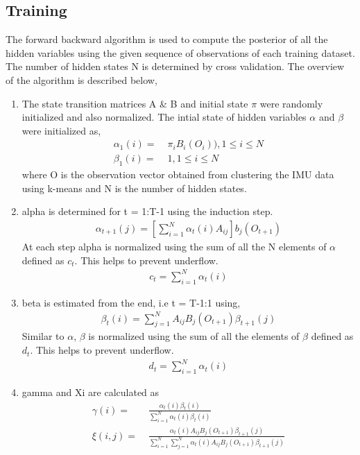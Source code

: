 \documentclass[fleqn,10pt]{SelfArx} %
\begin{document}
\subsection{Training}
The forward backward algorithm is used to compute the posterior of all the hidden variables using the given sequence of observations of each training dataset. The number of hidden states N is determined by cross validation. The overview of the algorithm is described below,
\begin{enumerate}
\item The state transition matrices A \& B and initial state $\pi$ were randomly initialized and also normalized. The intial state of hidden variables $\alpha$ and $\beta$ were initialized as,
\begin{align*}
\alpha_1(i) =&\; \pi_i B_i(O_i)), 1\le i \le N \\
\beta_1(i) =&\; 1, 1\le i \le N
\end{align*}
where O is the observation vector obtained from clustering the IMU data using k-means and N is the number of hidden states.
\item alpha is determined for t = 1:T-1 using the induction step.
\begin{align*}
\alpha_{t+1}(j) = \left[\sum_{i=1}^N \alpha_t(i)A_{ij}\right]b_j(O_{t+1})
\end{align*}
At each step alpha is normalized using the sum of all the N elements of $\alpha$ defined as $c_t$. This helps to prevent underflow.
\begin{align*}
c_t = \sum_{i=1}^N \alpha_t(i)
\end{align*}
\item beta is estimated from the end, i.e t = T-1:1 using,
\begin{align*}
\beta_t(i) = \sum_{j=1}^N A_{ij} B_j(O_{t+1}) \beta_{t+1}(j)
\end{align*}
Similar to $\alpha$, $\beta$ is normalized using the sum of all the elements of $\beta$ defined as $d_t$. This helps to prevent underflow.
\begin{align*}
d_t = \sum_{i=1}^N \alpha_t(i)
\end{align*}
\item gamma and Xi are calculated as
\begin{align*}
\gamma(i) =&\; \frac{\alpha_t(i) \beta_t(i)}{\sum_{i=1}^N \alpha_t(i) \beta_t(i)} \\
\xi(i,j) =&\; \frac{\alpha_t(i) A_{ij}B_j(O_{t+1})\beta_{t+1}(j)}{\sum_{i=1}^N \sum_{j=1}^N \alpha_t(i) A_{ij}B_j(O_{t+1})\beta_{t+1}(j)}

\end{align*}
\end{enumerate}
\end{document}
